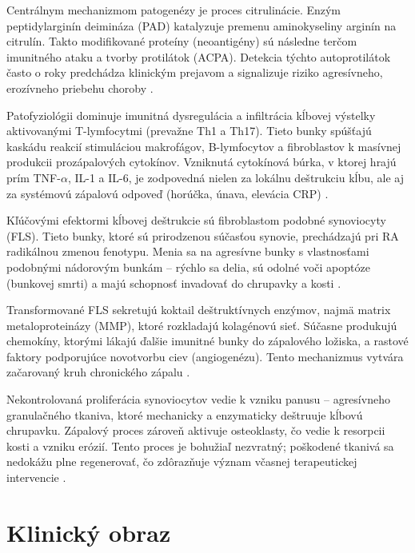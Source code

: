 Centrálnym mechanizmom patogenézy je proces citrulinácie. Enzým peptidylarginín deimináza (PAD) katalyzuje premenu aminokyseliny arginín na citrulín. Takto modifikované proteíny (neoantigény) sú následne terčom imunitného ataku a tvorby protilátok (ACPA). Detekcia týchto autoprotilátok často o roky predchádza klinickým prejavom a signalizuje riziko agresívneho, erozívneho priebehu choroby \parencite{choy2012understanding}. 



Patofyziológii dominuje imunitná dysregulácia a infiltrácia kĺbovej výstelky aktivovanými T-lymfocytmi (prevažne Th1 a Th17). Tieto bunky spúšťajú kaskádu reakcií stimuláciou makrofágov, B-lymfocytov a fibroblastov k masívnej produkcii prozápalových cytokínov. Vzniknutá cytokínová búrka, v ktorej hrajú prím TNF-$\alpha$, IL-1 a IL-6, je zodpovedná nielen za lokálnu deštrukciu kĺbu, ale aj za systémovú zápalovú odpoveď (horúčka, únava, elevácia CRP) \parencite{Gao2020}. 



Kľúčovými efektormi kĺbovej deštrukcie sú fibroblastom podobné synoviocyty (FLS). Tieto bunky, ktoré sú prirodzenou súčasťou synovie, prechádzajú pri RA radikálnou zmenou fenotypu. Menia sa na agresívne bunky s vlastnosťami podobnými nádorovým bunkám – rýchlo sa delia, sú odolné voči apoptóze (bunkovej smrti) a majú schopnosť invadovať do chrupavky a kosti \parencite{smith2015role}. 

Transformované FLS sekretujú koktail deštruktívnych enzýmov, najmä matrix metaloproteinázy (MMP), ktoré rozkladajú kolagénovú sieť. Súčasne produkujú chemokíny, ktorými lákajú ďalšie imunitné bunky do zápalového ložiska, a rastové faktory podporujúce novotvorbu ciev (angiogenézu). Tento mechanizmus vytvára začarovaný kruh chronického zápalu \parencite{smith2015role, tak2011mechanisms}. 



Nekontrolovaná proliferácia synoviocytov vedie k vzniku panusu – agresívneho granulačného tkaniva, ktoré mechanicky a enzymaticky deštruuje kĺbovú chrupavku. Zápalový proces zároveň aktivuje osteoklasty, čo vedie k resorpcii kosti a vzniku erózií. Tento proces je bohužiaľ nezvratný; poškodené tkanivá sa nedokážu plne regenerovať, čo zdôrazňuje význam včasnej terapeutickej intervencie \parencite{Rovensky2001, isaacs2002fast}. 

 

\section{Klinický obraz}

